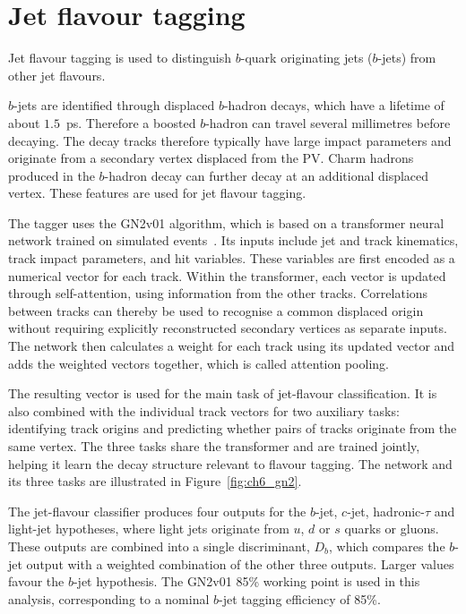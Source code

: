 \section{Jet flavour tagging}
\label{sec:ch6_btag}

Jet flavour tagging is used to distinguish $b$-quark originating jets ($b$-jets) from other jet flavours.

$b$-jets are identified through displaced $b$-hadron decays, which have a lifetime of about $1.5$~ps. Therefore a boosted $b$-hadron can travel several millimetres before decaying.
The decay tracks therefore typically have large impact parameters and originate from a secondary vertex displaced from the PV.
Charm hadrons produced in the $b$-hadron decay can further decay at an additional displaced vertex.
These features are used for jet flavour tagging.

The tagger uses the GN2v01 algorithm, which is based on a transformer neural network trained on simulated events~\cite{ATLAS2026GN2}.
Its inputs include jet and track kinematics, track impact parameters, and hit variables.
These variables are first encoded as a numerical vector for each track.
Within the transformer, each vector is updated through self-attention, using information from the other tracks.
Correlations between tracks can thereby be used to recognise a common displaced origin without requiring explicitly reconstructed secondary vertices as separate inputs.
The network then calculates a weight for each track using its updated vector and adds the weighted vectors together, which is called attention pooling.

The resulting vector is used for the main task of jet-flavour classification.
It is also combined with the individual track vectors for two auxiliary tasks: identifying track origins and predicting whether pairs of tracks originate from the same vertex.
The three tasks share the transformer and are trained jointly, helping it learn the decay structure relevant to flavour tagging.
The network and its three tasks are illustrated in Figure~\ref{fig:ch6_gn2}.

The jet-flavour classifier produces four outputs for the $b$-jet, $c$-jet, hadronic-$\tau$ and light-jet hypotheses, where light jets originate from $u$, $d$ or $s$ quarks or gluons.
These outputs are combined into a single discriminant, $D_b$, which compares the $b$-jet output with a weighted combination of the other three outputs.
Larger values favour the $b$-jet hypothesis.
The GN2v01 85\% working point is used in this analysis, corresponding to a nominal $b$-jet tagging efficiency of 85\%.

